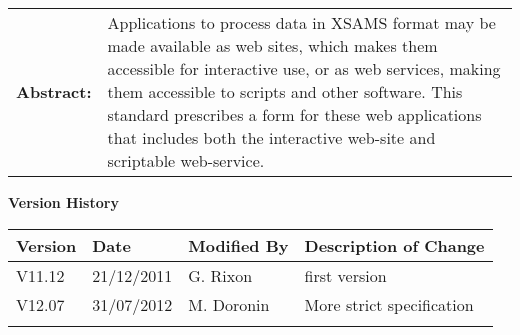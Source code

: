 {\begin{titlepage}
\begin{tabular}{p{1.7in}p{4.3in}}
\textbf{Abstract:} & 
Applications to process data in XSAMS format may be made available as web sites, 
which makes them accessible for interactive use, or as web services, 
making them accessible to scripts and other software. 
This standard prescribes a form for these web applications 
that includes both the interactive web-site and scriptable web-service.
\end{tabular}



\end{titlepage}

\noindent \large \textbf{Version History} \normalsize

\noindent \begin{tabular}{|l|l|l|l|} 
\hline 
\textbf{Version} & \textbf{Date} & \textbf{Modified By} & \textbf{Description of Change} \\ \hline 
V11.12   & 21/12/2011 & G. Rixon & first version \\ \hline 
V12.07	 & 31/07/2012 & M. Doronin & More strict specification \\ \hline 
 &  &  &  \\ \hline 
\end{tabular}



}